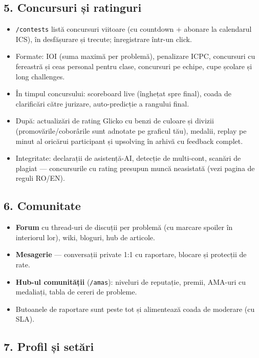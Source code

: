 \documentclass[
]{article}
\providecommand{\tightlist}{%
  \setlength{\itemsep}{0pt}\setlength{\parskip}{0pt}}
\begin{document}
\subsection{5. Concursuri și
ratinguri}\label{5-concursuri-ux219i-ratinguri}

\begin{itemize}
\tightlist
\item
  \texttt{/contests} listă concursuri viitoare (cu countdown + abonare
  la calendarul ICS), în desfășurare și trecute; înregistrare într-un
  click.
\item
  Formate: IOI (suma maximă per problemă), penalizare ICPC, concursuri
  cu fereastră și ceas personal pentru clase, concursuri pe echipe, cupe
  școlare și long challenges.
\item
  În timpul concursului: scoreboard live (înghețat spre final), coada de
  clarificări către jurizare, auto-predicție a rangului final.
\item
  După: actualizări de rating Glicko cu benzi de culoare și divizii
  (promovările/coborârile sunt adnotate pe graficul tău), medalii,
  replay pe minut al oricărui participant și upsolving în arhivă cu
  feedback complet.
\item
  Integritate: declarații de asistență-AI, detecție de multi-cont,
  scanări de plagiat --- concursurile cu rating presupun muncă
  neasistată (vezi pagina de reguli RO/EN).
\end{itemize}

\subsection{6. Comunitate}\label{6-comunitate}

\begin{itemize}
\tightlist
\item
  \textbf{Forum} cu thread-uri de discuții per problemă (cu marcare
  spoiler în interiorul lor), wiki, bloguri, hub de articole.
\item
  \textbf{Mesagerie} --- conversații private 1:1 cu raportare, blocare
  și protecții de rate.
\item
  \textbf{Hub-ul comunității} (\texttt{/amas}): niveluri de reputație,
  premii, AMA-uri cu medaliați, tabla de cereri de probleme.
\item
  Butoanele de raportare sunt peste tot și alimentează coada de moderare
  (cu SLA).
\end{itemize}

\subsection{7. Profil și setări}\label{7-profil-ux219i-setux103ri}
\end{document}
